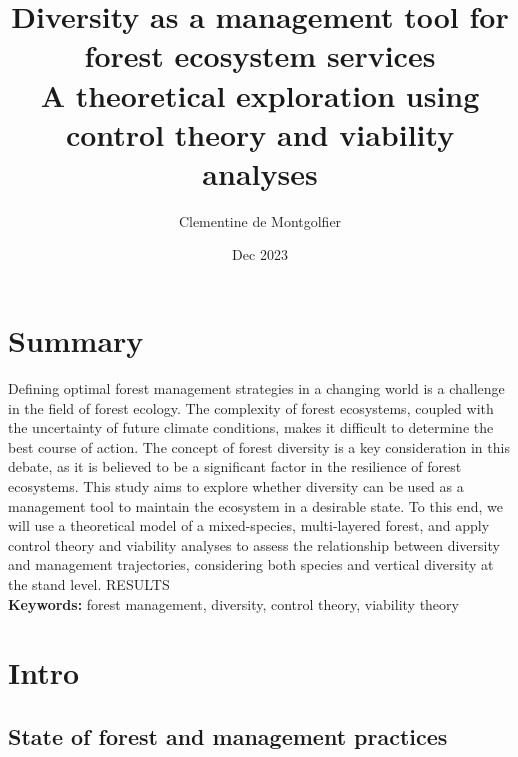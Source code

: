 \documentclass{article}
\title{Diversity as a management tool for forest ecosystem services \\ 
\large A theoretical exploration using control theory and viability analyses}
\author{Clementine de Montgolfier}
\date{Dec 2023}
\begin{document}
\maketitle

\section{Summary}

Defining optimal forest management strategies in a changing world is a challenge in the field of forest ecology. The complexity of forest ecosystems, coupled with the uncertainty of future climate conditions, makes it difficult to determine the best course of action. The concept of forest diversity is a key consideration in this debate, as it is believed to be a significant factor in the resilience of forest ecosystems. This study aims to explore whether diversity can be used as a management tool to maintain the ecosystem in a desirable state. To this end, we will use a theoretical model of a mixed-species, multi-layered forest, and apply control theory and viability analyses to assess the relationship between diversity and management trajectories, considering both species and vertical diversity at the stand level. RESULTS\\

\noindent \textbf{Keywords:} forest management, diversity, control theory, viability theory

\section{Intro}

\subsection{State of forest and management practices}
\end{document}
